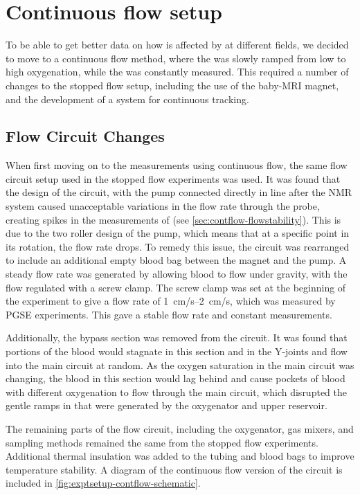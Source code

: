 \section{Continuous flow setup}
\label{sec:exptsetup-contflow}

To be able to get better data on how \Ttwo is affected by \SOtwo at different fields, we decided to move to a continuous flow method, where the \SOtwo was slowly ramped from low to high oxygenation, while the \Ttwo was constantly measured.
This required a number of changes to the stopped flow setup, including the use of the baby-MRI magnet, and the development of a system for continuous \SOtwo tracking.

\subsection{Flow Circuit Changes}
When first moving on to the measurements using continuous flow, the same flow circuit setup used in the stopped flow experiments was used.
It was found that the design of the circuit, with the pump connected directly in line after the NMR system caused unacceptable variations in the flow rate through the probe, creating spikes in the measurements of \Ttwo (see \autoref{sec:contflow-flowstability}).
This is due to the two roller design of the pump, which means that at a specific point in its rotation, the flow rate drops.
To remedy this issue, the circuit was rearranged to include an additional empty blood bag between the magnet and the pump.
A steady flow rate was generated by allowing blood to flow under gravity, with the flow regulated with a screw clamp.
The screw clamp was set at the beginning of the experiment to give a flow rate of \SIrange{1}{2}{cm/s}, which was measured by PGSE experiments.
This gave a stable flow rate and constant \Ttwo measurements.

Additionally, the bypass section was removed from the circuit.
It was found that portions of the blood would stagnate in this section and in the Y-joints and flow into the main circuit at random.
As the oxygen saturation in the main circuit was changing, the blood in this section would lag behind and cause pockets of blood with different oxygenation to flow through the main circuit, which disrupted the gentle ramps in \SOtwo that were generated by the oxygenator and upper reservoir.

The remaining parts of the flow circuit, including the oxygenator, gas mixers, and sampling methods remained the same from the stopped flow experiments.
Additional thermal insulation was added to the tubing and blood bags to improve temperature stability.
A diagram of the continuous flow version of the circuit is included in \autoref{fig:exptsetup-contflow-schematic}.

